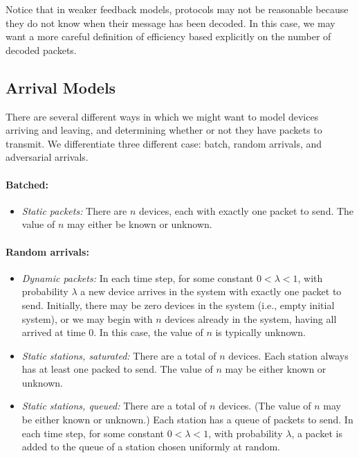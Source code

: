 Notice that in weaker feedback models, protocols may not be reasonable because they do not know when their message has been decoded.  In this case, we may want a more careful definition of efficiency based explicitly on the number of decoded packets.

\subsection{Arrival Models}

There are several different ways in which we might want to model devices arriving and leaving, and determining whether or not they have packets to transmit.  We differentiate three different case: batch, random arrivals, and adversarial arrivals.

\paragraph{Batched:}
\begin{itemize}
	\item \emph{Static packets:} There are $n$ devices, each with exactly one packet to send.  The value of $n$ may either be known or unknown.
\end{itemize}

\paragraph{Random arrivals:}
\begin{itemize}
	\item \emph{Dynamic packets:} In each time step, for some constant $0 < \lambda < 1$, with probability $\lambda$ a new device arrives in the system with exactly one packet to send.  Initially, there may be zero devices in the system (i.e., empty initial system), or we may begin with $n$ devices already in the system, having all arrived at time 0.  In this case, the value of $n$ is typically unknown.

	\item \emph{Static stations, saturated:} There are a total of $n$ devices.  Each station always has at least one packed to send.  The value of $n$ may be either known or unknown.  

	\item \emph{Static stations, queued:} There are a total of $n$ devices.  (The value of $n$ may be either known or unknown.) Each station has a queue of packets to send.  In each time step, for some constant $0 < \lambda < 1$, with probability $\lambda$, a packet is added to the queue of a station chosen uniformly at random.
\end{itemize}

